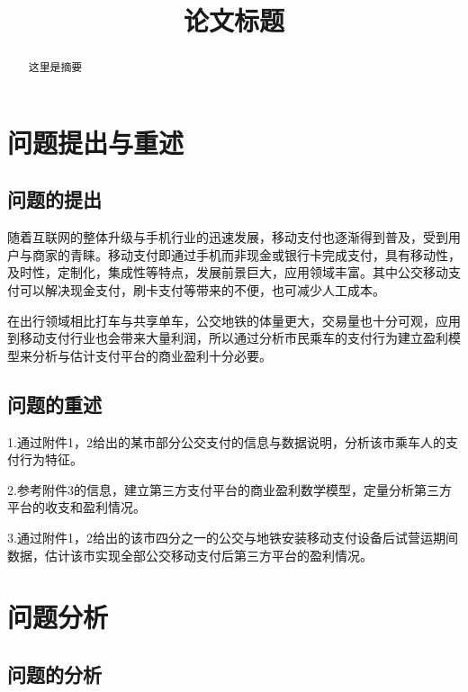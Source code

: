 \documentclass[withoutpreface,bwprint]{cumcmthesis} %
\title{论文标题}
\begin{document}
 \maketitle
 \begin{abstract}

这里是摘要

\end{abstract}

\tableofcontents

\section{问题提出与重述}

\subsection{问题的提出}

随着互联网的整体升级与手机行业的迅速发展，移动支付也逐渐得到普及，受到用户与商家的青睐。移动支付即通过手机而非现金或银行卡完成支付，具有移动性，及时性，定制化，集成性等特点，发展前景巨大，应用领域丰富。其中公交移动支付可以解决现金支付，刷卡支付等带来的不便，也可减少人工成本。

在出行领域相比打车与共享单车，公交地铁的体量更大，交易量也十分可观，应用到移动支付行业也会带来大量利润，所以通过分析市民乘车的支付行为建立盈利模型来分析与估计支付平台的商业盈利十分必要。



\subsection{问题的重述}

1.通过附件1，2给出的某市部分公交支付的信息与数据说明，分析该市乘车人的支付行为特征。

2.参考附件3的信息，建立第三方支付平台的商业盈利数学模型，定量分析第三方平台的收支和盈利情况。

3.通过附件1，2给出的该市四分之一的公交与地铁安装移动支付设备后试营运期间数据，估计该市实现全部公交移动支付后第三方平台的盈利情况。


\section{问题分析}

\subsection{问题的分析}
\end{document}
